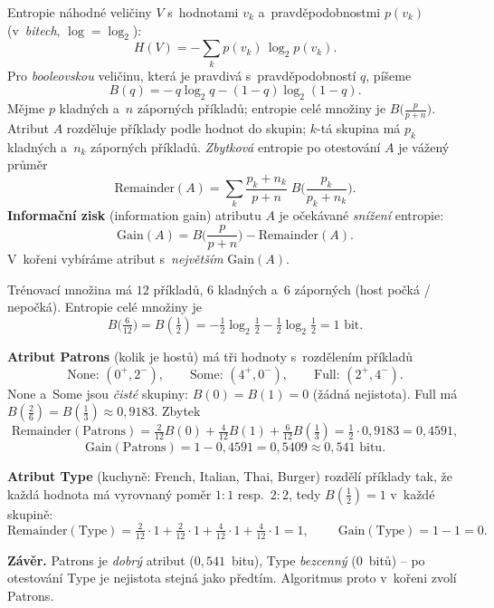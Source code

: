 \begin{definice}
Entropie náhodné veličiny $V$ s~hodnotami $v_k$ a~pravděpodobnostmi $p(v_k)$ (v~\emph{bitech}, $\log=\log_2$):
\[ H(V) = -\sum_k p(v_k)\,\log_2 p(v_k). \]
Pro \emph{booleovskou} veličinu, která je pravdivá s~pravděpodobností $q$, píšeme
\[ B(q) = -\,q\log_2 q - (1-q)\log_2(1-q). \]
Mějme $p$ kladných a~$n$ záporných příkladů; entropie celé množiny je $B\!\big(\tfrac{p}{p+n}\big)$. Atribut $A$ rozděluje příklady podle hodnot do skupin; $k$-tá skupina má $p_k$ kladných a~$n_k$ záporných příkladů. \emph{Zbytková} entropie po otestování $A$ je vážený průměr
\[ \mathrm{Remainder}(A) = \sum_k \frac{p_k+n_k}{p+n}\;B\!\Big(\frac{p_k}{p_k+n_k}\Big). \]
\textbf{Informační zisk} (information gain) atributu $A$ je očekávané \emph{snížení} entropie:
\[ \mathrm{Gain}(A) = B\!\Big(\frac{p}{p+n}\Big) - \mathrm{Remainder}(A). \]
V~kořeni vybíráme atribut s~\emph{největším} $\mathrm{Gain}(A)$.
\end{definice}

\begin{priklad}
Trénovací množina má $12$ příkladů, $6$ kladných a~$6$ záporných (host počká / nepočká). Entropie celé množiny je
\[ B\!\Big(\tfrac{6}{12}\Big) = B(\tfrac12) = -\tfrac12\log_2\tfrac12-\tfrac12\log_2\tfrac12 = 1 \text{ bit}. \]

\textbf{Atribut Patrons} (kolik je hostů) má tři hodnoty s~rozdělením příkladů
\[ \text{None: } (0^{+},2^{-}),\qquad \text{Some: } (4^{+},0^{-}),\qquad \text{Full: } (2^{+},4^{-}). \]
None a~Some jsou \emph{čisté} skupiny: $B(0)=B(1)=0$ (žádná nejistota). Full má $B(\tfrac{2}{6})=B(\tfrac13)\approx 0{,}9183$. Zbytek
\[ \mathrm{Remainder}(\text{Patrons}) = \tfrac{2}{12}B(0) + \tfrac{4}{12}B(1) + \tfrac{6}{12}B(\tfrac13) = \tfrac12\cdot 0{,}9183 = 0{,}4591, \]
\[ \boxed{\;\mathrm{Gain}(\text{Patrons}) = 1 - 0{,}4591 = 0{,}5409 \approx 0{,}541 \text{ bitu}.\;} \]

\textbf{Atribut Type} (kuchyně: French, Italian, Thai, Burger) rozdělí příklady tak, že každá hodnota má vyrovnaný poměr $1\!:\!1$ resp.\ $2\!:\!2$, tedy $B(\tfrac12)=1$ v~každé skupině:
\[ \mathrm{Remainder}(\text{Type}) = \tfrac{2}{12}\cdot 1 + \tfrac{2}{12}\cdot 1 + \tfrac{4}{12}\cdot 1 + \tfrac{4}{12}\cdot 1 = 1, \qquad \boxed{\;\mathrm{Gain}(\text{Type}) = 1 - 1 = 0.\;} \]

\textbf{Závěr.} Patrons je \emph{dobrý} atribut ($0{,}541$~bitu), Type \emph{bezcenný} ($0$~bitů) -- po otestování Type je nejistota stejná jako předtím. Algoritmus proto v~kořeni zvolí Patrons.
\end{priklad}

